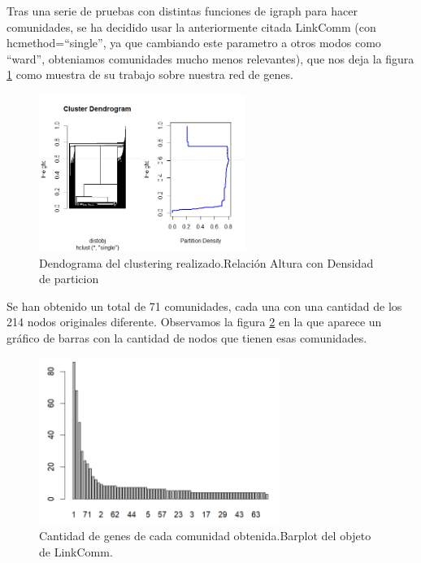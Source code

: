 Tras una serie de pruebas con distintas funciones de igraph para hacer comunidades, se ha decidido usar la anteriormente citada LinkComm (con hcmethod=“single”, ya que cambiando este parametro a otros modos como “ward”, obteniamos comunidades mucho menos relevantes), que nos deja la figura \ref{fig:LinkComm1} como muestra de su trabajo sobre nuestra red de genes.

\begin{figure}[h]
	\centering
	\includegraphics[width=0.60\textwidth]{figures/Grapichs_LinkComm.png}
	\caption{Dendograma del clustering realizado.Relación Altura con Densidad de particion}
	\label{fig:LinkComm1}
\end{figure}

\newpage

\hfill

Se han obtenido un total de 71 comunidades, cada una con una cantidad de los 214 nodos originales diferente. Observamos la figura \ref{fig:LinkComm2} en la que aparece un gráfico de barras con la cantidad de nodos que tienen esas comunidades.

\begin{figure}[h]
	\centering
	\includegraphics[width=0.70\textwidth]{figures/barplot_communities.PNG}
	\caption{Cantidad de genes de cada comunidad obtenida.Barplot del objeto de LinkComm.}
	\label{fig:LinkComm2}
\end{figure}


